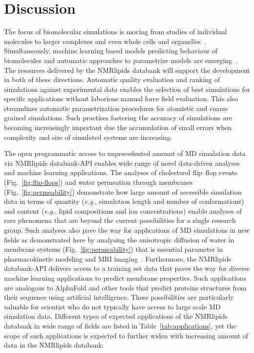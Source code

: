\documentclass[fleqn,10pt]{wlscirep}
\begin{document}
\section{Discussion}


The focus of biomolecular simulations is moving from studies of individual molecules to larger complexes and even whole cells and organelles~\cite{johnson15,thornburg22,gupta22}. Simultaneously, machine learning based models predicting behaviour of biomolecules and automatic approaches to parametrize models are emerging~\cite{jumper21,antila22b}. The resources delivered by the NMRlipids databank will support the development in both of these directions. Automatic quality evaluation and ranking of simulations against experimental data enables the selection of best simulations for specific applications without laborious manual force field evaluation. This also streamlines automatic parametrization procedures for atomistic and coarse grained simulations. Such practises fostering the accuracy of simulations are becoming increasingly important due the accumulation of small errors when complexity and size of simulated systems are increasing.

The open programmatic access to unprecedented amount of MD simulation data via NMRlipids databank-API enables wide range of novel data-driven analyses and machine learning applications. The analyses of cholesterol flip--flop events (Fig.~\ref{fig:flip-flops}) and water permeation through membranes (Fig.~\ref{fig:permeability}) demonstrate how large amount of accessible simulation data in terms of quantity (\textit{e.g.}, simulation length and number of conformations) and content (\textit{e.g.}, lipid compositions and ion concentrations) enable analyses of rare phenomena that are beyond the current possibilities for a single research group. Such analyses also pave the way for applications of MD simulations in new fields as demonstrated here by analysing the anisotropic diffusion of water in membrane systems (Fig.~\ref{fig:permeability}) that is essential parameter in pharmacokinetic modeling and MRI imaging~\cite{nitsche19,topgaard20}. Furthermore, the NMRlipids databank-API delivers access to a training set data that paves the way for diverse machine learning applications to 
predict membrane properties. Such applications are analogous to AlphaFold \cite{jumper21} and other tools that predict proteins structures from their sequence using artificial intelligence. These possibilities are particularly valuable for scientist who do not typically have access to large scale MD simulation data. Different types of expected applications of the NMRlipids databank in wide range of fields are listed in Table~\ref{tab:applications}, yet the scope of such applications
is expected to further widen with increasing amount of data in the NMRlipids databank.  
\end{document}
